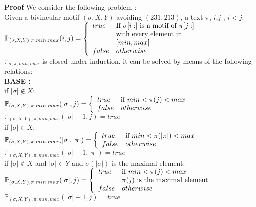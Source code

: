 \documentclass[12pt, a4paper]{article}
\newcommand{\ptext}{\pi}
\newcommand{\pmotif}{\sigma}
\newcommand{\x}{X}
\newcommand{\y}{Y}
\newcommand{\bmotif}{(\sigma,\x,\y)}
\begin{document}
			\textbf{Proof }
			We consider the following problem :\\
			
			Given a bivincular motif $\bmotif$ avoiding $(231,213)$,
			a text $\ptext$, $i$,$j$ , $i<j$.\\
			
			$\mathbb{P}_{\bmotif,\ptext,min,max}(i,j)= \left\{ 
				\begin{array}{l l}
					true & \text{If $\pmotif[i:]$ is a motif of $\ptext[j:]$}\\
						& \text{with every element in}\\ 
						&[min,max]\\
		
					false & otherwise\\
				\end{array} \right.$\\
		
		
		
		
			$\mathbb{P}_{\pmotif,\ptext,min,max}$ is closed under induction. 
			it can be
			solved by means of the following relations:\\
			
			
			\textbf{BASE :} \\
			
			if $|\pmotif| \notin  \x : $\\		
			$\mathbb{P}_{\bmotif,\ptext,min,max}(|\pmotif|,j)= \left\{ 
					\begin{array}{l l}
						true & \text{if $min<\ptext(j)<max$
						}\\
						false & otherwise\\
					\end{array} \right. $\\	
			$\mathbb{P}_{\bmotif,\ptext,min,max}(|\pmotif|+1,j)= true $\\
			
			if $|\pmotif| \in  \x : $\\		
			$\mathbb{P}_{\bmotif,\ptext,min,max}(|\pmotif|,|\ptext|)= \left\{ 
					\begin{array}{l l}
						true & \text{if $min<\ptext(|\ptext|)<max$
						}\\
						false & otherwise\\
					\end{array} \right. $\\	
			$\mathbb{P}_{\bmotif,\ptext,min,max}(|\pmotif|+1,|\ptext|)= true $\\
			
			if $|\pmotif| \notin  \x$  
			and $|\pmotif| \in  \y$ 
			and $\pmotif(|\pmotif|)$ is the maximal element: \\		
			$\mathbb{P}_{\bmotif,\ptext,min,max}(|\pmotif|,j)= \left\{ 
					\begin{array}{l l}
						true & \text{if $min<\ptext(j)<max$
						}\\
						&\text{$\ptext(j)$ is the maximal element}\\
						false & otherwise\\
					\end{array} \right. $\\	
			$\mathbb{P}_{\bmotif,\ptext,min,max}(|\pmotif|+1,j)= true $\\
			
\end{document}
